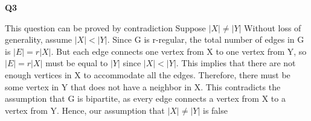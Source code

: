 \documentclass{article}
\begin{document}
\textbf{Q3}

This question can be proved by contradiction
Suppose $ |X| \neq |Y| $
Without loss of generality, assume $|X| < |Y|$.
Since G is r-regular, the total number of edges in G is $|E| = r|X|$.
But each edge connects one vertex from X to one vertex from Y, so $|E| = r|X|$ must be equal to $|Y|$ since $|X| < |Y|$.
This implies that there are not enough vertices in X to accommodate all the edges.
Therefore, there must be some vertex in Y that does not have a neighbor in X.
This contradicts the assumption that G is bipartite, as every edge connects a vertex from X to a vertex from Y.
Hence, our assumption that $|X| \neq |Y|$ is false
\end{document}

